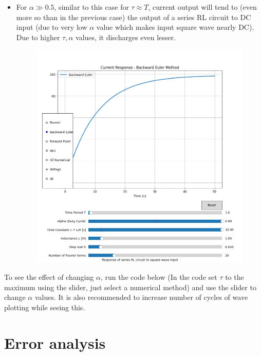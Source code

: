\documentclass[12pt,a4paper]{report}
\begin{document}
\begin{itemize}
\begin{itemize}
        \item For $\alpha \gg 0.5$, similar to this case for $\tau \approx T$, current output will tend to (even more so than in the previous case) the output of a series RL circuit to DC input (due to very low $\alpha$ value which makes input square wave nearly DC). Due to higher $\tau, \alpha$ values, it discharges even lesser.
        \pagebreak
        \begin{figure}[h!]
	\centering
	\includegraphics[scale=0.6]{figs/tau>>T-3.png}
        \end{figure}
    \end{itemize}
    To see the effect of changing $\alpha$, run the code below (In the code set $\tau$ to the maximum using the slider, just select a numerical method) and use the slider to change $\alpha$ values. It is also recommended to increase number of cycles of wave plotting while seeing this.
\end{itemize}
\chapter{Error analysis}
\end{document}

